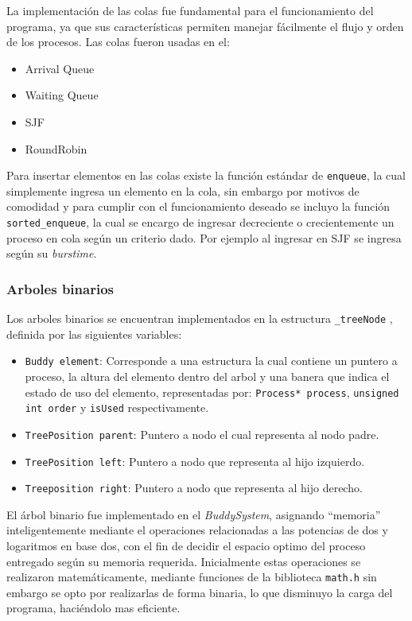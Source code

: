 La implementación de las colas fue fundamental para el funcionamiento del programa, ya que sus características permiten manejar fácilmente el flujo y orden de los procesos. Las colas fueron usadas en el:
\begin{itemize}
    \item Arrival Queue
    \item Waiting Queue
    \item SJF
    \item RoundRobin
\end{itemize}


Para insertar elementos en las colas existe la función estándar de \texttt{enqueue}, la cual simplemente ingresa un elemento en la cola, sin embargo por motivos de comodidad y para cumplir con el funcionamiento deseado se incluyo la función \texttt{sorted\_enqueue}, la cual se encargo de ingresar decreciente o crecientemente  un proceso en cola según un criterio dado. Por ejemplo al ingresar en  SJF se ingresa según su \textit{burstime}.

\subsubsection*{Arboles binarios}
Los arboles binarios se encuentran implementados en la estructura \texttt{\_treeNode} , definida por las siguientes variables:
\begin{itemize}
    \item \texttt{Buddy element}: Corresponde  a una estructura la cual contiene un puntero a proceso, la altura del elemento dentro del arbol y una banera que indica el estado de uso del elemento, representadas por: \texttt{Process* process}, \texttt{unsigned int order} y \texttt{isUsed} respectivamente.
    \item \texttt{TreePosition parent}: Puntero a nodo el cual representa al nodo padre.
    \item \texttt{TreePosition left}: Puntero a nodo que representa al hijo izquierdo.
    \item \texttt{Treeposition right}: Puntero a nodo que representa al hijo derecho.
\end{itemize}

El árbol binario fue implementado en el \textit{BuddySystem},  asignando ``memoria'' inteligentemente mediante el operaciones relacionadas a las potencias de dos y logaritmos en base dos, con el fin de decidir el espacio optimo del proceso entregado según su memoria requerida. Inicialmente estas operaciones se realizaron matemáticamente, mediante funciones de la biblioteca \texttt{math.h} sin embargo se opto por realizarlas de forma binaria, lo que disminuyo la carga del programa, haciéndolo mas eficiente.



